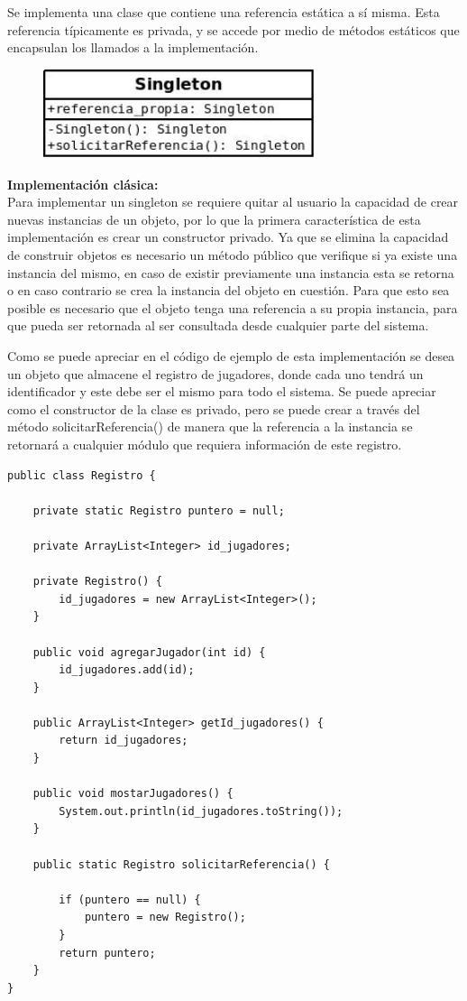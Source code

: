 \documentclass[12pt]{book}
\begin{document}
Se implementa una clase que contiene una referencia estática a sí misma. Esta referencia típicamente es privada, y se accede por medio de métodos estáticos que encapsulan los llamados a la implementación. \\

\begin{figure}[h]
\includegraphics[width=8cm]{imagenes/singleton.jpeg}
\end{figure}


\textbf{Implementación clásica:} \\
Para implementar un singleton se requiere quitar al usuario la capacidad de crear nuevas instancias de un objeto, por lo que la primera característica de esta implementación es crear un constructor privado.
Ya que se elimina la capacidad de construir objetos es necesario un método público que verifique si ya existe una instancia del mismo, en caso de existir previamente una instancia esta se retorna o en caso contrario se crea la instancia del objeto en cuestión.
Para que esto sea posible es necesario que el objeto tenga una referencia a su propia instancia, para que pueda ser retornada al ser consultada desde cualquier parte del sistema.

Como se puede apreciar en el código de ejemplo de esta implementación se desea un objeto que almacene el registro de jugadores, donde cada uno tendrá un identificador y este debe ser el mismo para todo el sistema.
Se puede apreciar como el constructor de la clase es privado, pero se puede crear a través del método solicitarReferencia() de manera que la referencia a la instancia se retornará a cualquier módulo que requiera información de este registro.

\begin{verbatim}
public class Registro {
	
    private static Registro puntero = null;
    
    private ArrayList<Integer> id_jugadores;
    
    private Registro() {
        id_jugadores = new ArrayList<Integer>();
    }
    
    public void agregarJugador(int id) {
        id_jugadores.add(id);
    }
    
    public ArrayList<Integer> getId_jugadores() {
        return id_jugadores;
    }
    
    public void mostarJugadores() {
        System.out.println(id_jugadores.toString());
    }
    
    public static Registro solicitarReferencia() {

        if (puntero == null) {
            puntero = new Registro();
        }   
        return puntero;
    }
}
\end{verbatim}
\end{document}
